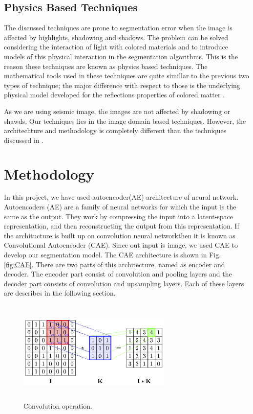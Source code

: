 \documentclass[conference]{IEEEtran}
\begin{document}
\subsection{Physics Based Techniques} 
The discussed techniques are prone to segmentation error when the image is affected by highlights, shadowing and shadows. The problem can be solved considering the interaction of light with colored materials and to introduce models
of this physical interaction in the segmentation algorithms. This is the reason these techniques are known as physics based techniques. The mathematical tools used in these techniques are quite simillar to the previous two types of technique; the major difference with respect to those is the underlying physical model developed for the reflections properties of colored matter \cite{lucchese2001colour}.

As we are using seismic image, the images are not affected by shadowing or shawds. Our techniques lies in the image domain based techniques. However, the architechture and methodology is completely different than the techniques discussed in \cite{lucchese2001colour}. 



\section{Methodology}\label{Methodology}

In this project, we have used autoencoder(AE) architecture of neural network. Autoencoders (AE) are a family of neural networks for which the input is the same as the output. They work by compressing the input into a latent-space representation, and then reconstructing the output from this representation. If the architucture is built up on convolution neural networkthen it is known as Convolutional Autoencoder (CAE). Since out input is image, we used CAE to develop our segmentation model. The CAE architecture is shown in Fig. \ref{fig:CAE}. There are two parts of this architecture, named as encoder and decoder. The encoder part consist of convolution and pooling layers and the decoder part consists of convolution and upsampling layers. Each of these layers are describes in the following section.

\begin{figure}[!t]
	\centerline{\includegraphics[width=3in, height=2in]{convlayer}}
	\caption{Convolution operation. \cite{conv2d}}
	\label{fig:conv_layer}
\end{figure} 
\end{document}
